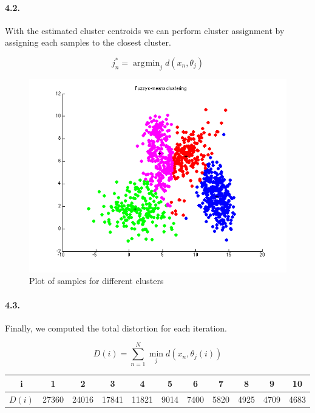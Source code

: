 \documentclass[a4paper]{article}
\DeclareMathOperator*{\argmin}{\arg\!\min}
\begin{document}
\paragraph{4.2.} With the estimated cluster centroids we can perform cluster assignment by assigning each samples to the closest cluster.

\begin{equation}
	j_n^* = \argmin_j d(x_n, \theta_j)
\end{equation}

	\begin{figure}[H]
		\centering
			\includegraphics[scale=.54]{images/clusters_plot.png}
		\caption{Plot of samples for different clusters}
	\end{figure}

\paragraph{4.3.} Finally, we computed the total distortion for each iteration.

	\begin{equation}
		D(i) = \sum_{n=1}^N \min_j d(x_n, \theta_j(i))
	\end{equation}
	
	\begin{center}
		\begin{tabular}{ |c |c |c |c |c |c |c |c |c |c |c| }
			\hline
			i & 1 & 2 & 3 & 4 & 5 & 6 & 7 & 8 & 9 & 10 \\ \hline
			$D(i)$ & 27360 & 24016 & 17841 & 11821 & 9014 & 7400 & 5820 & 4925 & 4709 & 4683 \\ \hline
		\end{tabular}
	\end{center}
	
\end{document}
